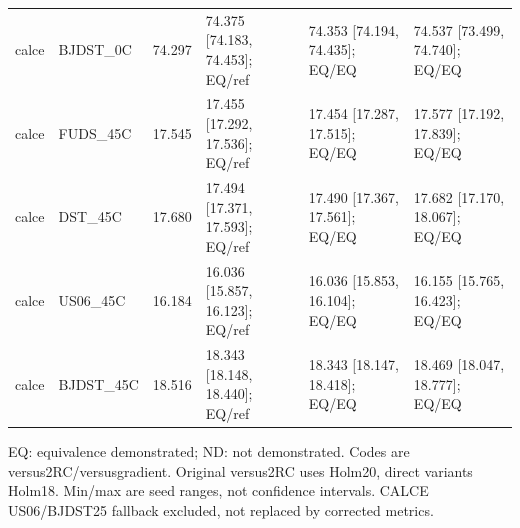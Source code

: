 \begin{table}[!t]
\begin{tabular}{llr p{} p{} p{}}
calce & BJDST\_0C & 74.297 & 74.375 [74.183, 74.453]; EQ/ref & 74.353 [74.194, 74.435]; EQ/EQ & 74.537 [73.499, 74.740]; EQ/EQ \\
calce & FUDS\_45C & 17.545 & 17.455 [17.292, 17.536]; EQ/ref & 17.454 [17.287, 17.515]; EQ/EQ & 17.577 [17.192, 17.839]; EQ/EQ \\
calce & DST\_45C & 17.680 & 17.494 [17.371, 17.593]; EQ/ref & 17.490 [17.367, 17.561]; EQ/EQ & 17.682 [17.170, 18.067]; EQ/EQ \\
calce & US06\_45C & 16.184 & 16.036 [15.857, 16.123]; EQ/ref & 16.036 [15.853, 16.104]; EQ/EQ & 16.155 [15.765, 16.423]; EQ/EQ \\
calce & BJDST\_45C & 18.516 & 18.343 [18.148, 18.440]; EQ/ref & 18.343 [18.147, 18.418]; EQ/EQ & 18.469 [18.047, 18.777]; EQ/EQ \\
\bottomrule
\end{tabular}
\par\smallskip\begin{minipage}{0.98\textwidth}\footnotesize EQ: equivalence demonstrated; ND: not demonstrated. Codes are versus2RC/versusgradient. Original versus2RC uses Holm20, direct variants Holm18. Min/max are seed ranges, not confidence intervals. CALCE US06/BJDST25 fallback excluded, not replaced by corrected metrics.\end{minipage}
\end{table}
